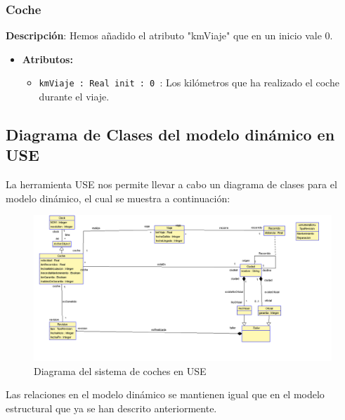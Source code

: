 \documentclass[12pt.a4paper]{article}
\begin{document}
\subsubsection{Coche}
\textbf{Descripción}:  Hemos añadido el atributo "kmViaje" que en un inicio vale 0.
\begin{itemize}
    \item \textbf{Atributos:}
    \begin{itemize}
        \item \texttt{kmViaje : Real init : 0 }: Los kilómetros que ha realizado el coche durante el viaje.
    \end{itemize}
\end{itemize}

\subsection{Diagrama de Clases del modelo dinámico en USE}
La herramienta USE nos permite llevar a cabo un diagrama de clases para el modelo dinámico, el cual se muestra a continuación:
\begin{figure}[H]
     \includegraphics[width=1\linewidth]{diagramas/USE_B.png}
     \caption{Diagrama del sistema de coches en USE}
     \label{Diagrama del sistema de coches en USE}
\end{figure}

Las relaciones en el modelo dinámico se mantienen igual que en el modelo estructural que ya se han descrito anteriormente.
\end{document}
